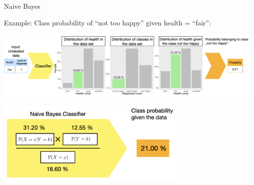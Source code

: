 \documentclass[11pt,compress,t,notes=noshow, xcolor=table]{beamer}
\begin{document}
\begin{vbframe}{Naive Bayes}
\newpage
\item \small Example: Class probability of ``not too happy'' given health = ``fair'':
\begin{center}
  \includegraphics[width=1\textwidth]{slides/supervised-classification/figure_man/nutshell-classif-distributions-prediction.png}
\end{center}
\begin{center}
  \includegraphics[width=0.7\textwidth]{slides/supervised-classification/figure_man/nutshell-classif-naive-bayes-formula.png}
\end{center}

\end{vbframe}

\endlecture
\end{document}

